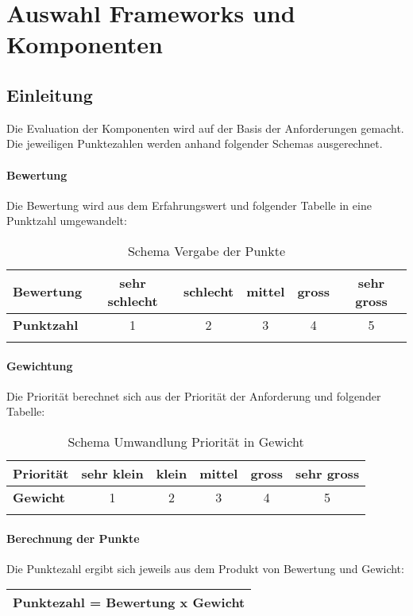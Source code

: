 \chapter{Auswahl Frameworks und Komponenten}\label{selection_rcp_fw}
\section{Einleitung}
Die Evaluation der Komponenten wird auf der Basis der Anforderungen gemacht. Die jeweiligen Punktezahlen werden anhand folgender Schemas ausgerechnet.
\subsubsection{Bewertung}
Die Bewertung wird aus dem Erfahrungswert und folgender Tabelle in eine Punktzahl umgewandelt:
\begin{longtable}{|l|c|c|c|c|c|}\hline
 \textbf{Bewertung} & sehr schlecht & schlecht & mittel & gross & sehr gross\\\hline
 \textbf{Punktzahl} & 1 & 2 & 3 & 4 & 5\\\hline
 \caption{Schema Vergabe der Punkte}
\end{longtable}

\subsubsection{Gewichtung}
Die Priorität berechnet sich aus der Priorität der Anforderung und folgender Tabelle:\begin{longtable}{|l|c|c|c|c|c|}\hline
 \textbf{Priorität} & sehr klein & klein & mittel & gross & sehr gross\\\hline
 \textbf{Gewicht} & 1 & 2 & 3 & 4 & 5\\\hline
 \caption{Schema Umwandlung Priorität in Gewicht}
\end{longtable}
\subsubsection{Berechnung der Punkte}
Die Punktezahl ergibt sich jeweils aus dem Produkt von Bewertung und Gewicht:
\begin{center}
\begin{tabular}{|c|}\hline
Punktezahl = Bewertung x Gewicht \\\hline
\end{tabular}
\end{center}
